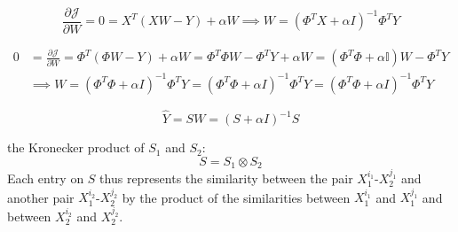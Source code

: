 \documentclass[sn-mathphys-num]{sn-jnl}%
\newcommand{\T}{^T}
\theoremstyle{thmstyleone}%
\theoremstyle{thmstyletwo}%
\theoremstyle{thmstylethree}%
\begin{document}
\begin{appendices}
\begin{equation} %
    \frac{\partial \mathcal{J}}{\partial W} = 0
    = X \T (X W - Y) + \alpha W
    \implies W = (\Phi\T X + \alpha I)^{-1} \Phi\T Y
\end{equation}

\begin{align} %
    0 &= \frac{\partial \mathcal{J}}{\partial W}
    = \Phi \T (\Phi W - Y) + \alpha W
    = \Phi \T \Phi W - \Phi \T Y + \alpha W
    = (\Phi \T \Phi + \alpha \mathbb{I}) W - \Phi \T Y \\
    &\implies W = (\Phi\T \Phi + \alpha I)^{-1} \Phi\T Y
    = (\Phi\T \Phi + \alpha I)^{-1} \Phi\T Y
    = (\Phi\T \Phi + \alpha I)^{-1} \Phi\T Y
\end{align}

%

%
%
\begin{equation}
    \hat Y = S W = (S + \alpha I)^{-1} S
\end{equation}

%
the Kronecker product of $S_1$ and $S_2$:
%
\begin{equation}
    S = S_1 \otimes S_2
\end{equation}
%
Each entry on $S$ thus represents the similarity between the pair $X_1^{i_1}$-$X_2^{j_1}$ and another pair $X_1^{i_2}$-$X_2^{j_2}$ by the product of the similarities between $X_1^{i_1}$ and $X_1^{j_1}$ and between $X_2^{i_2}$ and $X_2^{j_2}$.


\end{appendices}
\end{document}
